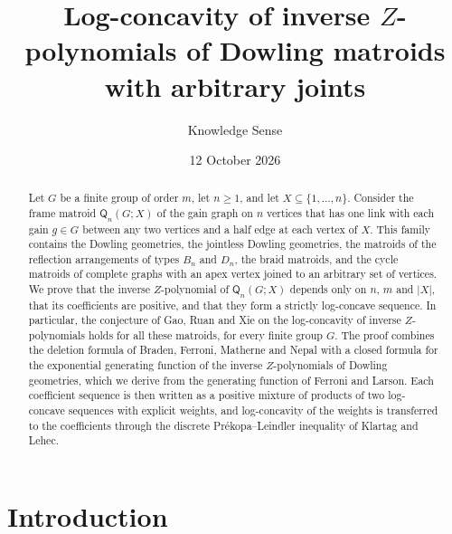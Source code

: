 \documentclass[11pt]{amsart}
\theoremstyle{definition}
\theoremstyle{remark}
\numberwithin{equation}{section}
\newcommand{\Q}{\mathsf{Q}}
\begin{document}
\title[Inverse $Z$-polynomials of Dowling matroids]{Log-concavity of inverse $Z$-polynomials of Dowling matroids with arbitrary joints}

\author{Knowledge Sense}

\date{12 October 2026}



\begin{abstract}
Let $G$ be a finite group of order $m$, let $n\ge 1$, and let $X\subseteq\{1,\dots,n\}$. Consider the frame matroid $\Q_n(G;X)$ of the gain graph on $n$ vertices that has one link with each gain $g\in G$ between any two vertices and a half edge at each vertex of $X$. This family contains the Dowling geometries, the jointless Dowling geometries, the matroids of the reflection arrangements of types $B_n$ and $D_n$, the braid matroids, and the cycle matroids of complete graphs with an apex vertex joined to an arbitrary set of vertices. We prove that the inverse $Z$-polynomial of $\Q_n(G;X)$ depends only on $n$, $m$ and $|X|$, that its coefficients are positive, and that they form a strictly log-concave sequence. In particular, the conjecture of Gao, Ruan and Xie on the log-concavity of inverse $Z$-polynomials holds for all these matroids, for every finite group $G$. The proof combines the deletion formula of Braden, Ferroni, Matherne and Nepal with a closed formula for the exponential generating function of the inverse $Z$-polynomials of Dowling geometries, which we derive from the generating function of Ferroni and Larson. Each coefficient sequence is then written as a positive mixture of products of two log-concave sequences with explicit weights, and log-concavity of the weights is transferred to the coefficients through the discrete Pr\'ekopa--Leindler inequality of Klartag and Lehec.
\end{abstract}

\maketitle

\section{Introduction}
\end{document}
